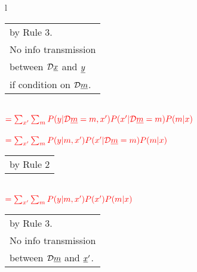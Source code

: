 \begin{longtable}{l}
\begin{tabular}{l}
\\
by Rule 3.\\
No info transmission\\
between ${\cal D}{\underline{x}}$ and ${\underline{y}}$\\
if condition on ${\cal D} {\underline{m}}$.
\end{tabular}
\\
$\color{red}=
\sum_{x'}
\sum_m 
P(y|{\cal D}{\underline{m}}=m, x')
P(x'|{\cal D}{\underline{m}}=m)
P(m|x)$
\\
\\
$\color{red}=
\sum_{x'}
\sum_m 
P(y|m, x')
P(x'|{\cal D}{\underline{m}}=m)
P(m|x)$
\\
\begin{tabular}{l}
\\
by Rule 2
\end{tabular}
\\
$\color{red}=
\sum_{x'}
\sum_m 
P(y|m, x')
P(x')
P(m|x)$
\\
\xymatrix{\\=}
\begin{tabular}{l}
\\
by Rule 3.
\\
No info transmission\\
between ${\cal D}{\underline{m}}$ and ${\underline{x}}'$.
\end{tabular}
\end{longtable}



